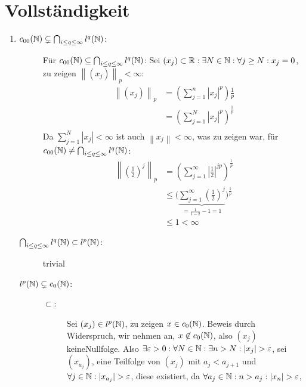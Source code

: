 \documentclass[sectionformat=aufgabe]{gadsescript}
\begin{document}
\section{Vollständigkeit}
\begin{enumerate}[label=(\alph*)]
	\item 
		\begin{description}
			\item[$ c_{00}(\mathbb{N} ) \subsetneq \bigcap_{i \leq q \leq \infty} l^q(\mathbb{N} ) $:] Für $ c_{00} (\mathbb{N} ) \subseteq \bigcap_{i \leq q \leq \infty} l^q(\mathbb{N} ) $: Sei $ (x_j) \subset \mathbb{R} : \exists N \in \mathbb{N} : \forall j \geq N : x_j = 0 $, zu zeigen $ \left\| (x_j) \right\| _p < \infty $:
				\begin{align*}
					\left\| (x_j) \right\| _p &= \left( \sum_{j=1}^{n} \left| x_j \right| ^p \right) \frac{ 1 }{ p }  \\
					&= \left( \sum_{j=1}^{N} \left| x_j \right| ^p \right) ^{\frac{ 1 }{ p } }  \\
				\end{align*}
				Da  $ \sum_{j=1}^{N} \left| x_j \right| < \infty $ ist auch $ \left\| x_j \right\| < \infty $, was zu zeigen war, für $ c_{00}(\mathbb{N} ) \neq \bigcap_{i \leq q \leq \infty} l^q(\mathbb{N} ) $:
				\begin{align*}
					\left\| \left( \frac{ 1 }{ 2 }  \right) ^j \right\| _p &= \left( \sum_{j=1}^{\infty} \left| \frac{ 1 }{ 2 }  \right|^{jp}   \right) ^{\frac{ 1 }{ p } }  \\
				       &\leq \bigg( \underbrace{\sum_{j=1}^{\infty} \left( \frac{ 1 }{ 2 }  \right) ^j}_{= \frac{ 1 }{ 1 - 2 } -1 = 1} \bigg) ^{\frac{ 1 }{ p } } \\
					&\leq 1 < \infty
				\end{align*}
			\item[$ \bigcap_{i \leq q \leq \infty} l^q(\mathbb{N} ) \subset l^p(\mathbb{N} ) $:] trivial
			\item[$ l^p(\mathbb{N} ) \subsetneq c_0(\mathbb{N} ) $:] 
				\begin{description}
					\item[$ \subset  $:] Sei $ (x_j) \in l^p(\mathbb{N} ) $, zu zeigen $ x \in c_0(\mathbb{N} ) $.
						Beweis durch Widerspruch, wir nehmen an, $ x \not\in c_0(\mathbb{N} ) $, also $ (x_j) $ keineNullfolge.
						Also $ \exists \varepsilon > 0 : \forall N \in \mathbb{N} : \exists n > N : \left| x_j \right| > \varepsilon $,
						sei $ (x_{a_j} ) $, eine Teilfolge von $ (x_j) $ mit $ a_j < a_{j+1}  $ und $ \forall j \in \mathbb{N} : | x_{a_j} | > \varepsilon $,
						diese existiert, da $ \forall a_j \in \mathbb{N} : n > a_j : \left| x_n \right| > \varepsilon  $,

\end{description}
\end{description}
\end{enumerate}
\end{document}
